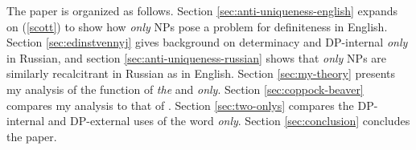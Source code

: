 The paper is organized as follows. Section \ref{sec:anti-uniqueness-english} expands on (\ref{scott}) to show how \textit{only} NPs pose a problem for definiteness in English. Section \ref{sec:edinstvennyj} gives background on determinacy and DP-internal \textit{only} in Russian, and section \ref{sec:anti-uniqueness-russian} shows that \textit{only} NPs are similarly recalcitrant in Russian as in English. Section \ref{sec:my-theory} presents my analysis of the function of \textit{the} and \textit{only}. Section \ref{sec:coppock-beaver} compares my analysis to that of \citet{cb2015}. Section \ref{sec:two-onlys} compares the DP-internal and DP-external uses of the word \textit{only}. Section \ref{sec:conclusion} concludes the paper.